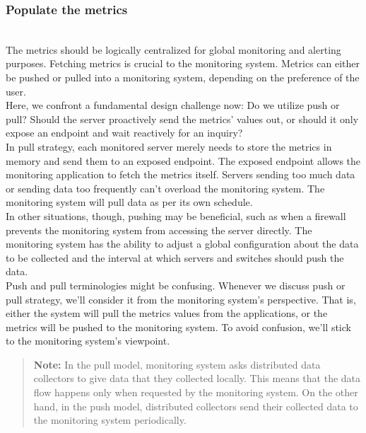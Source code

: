 \subsubsection{Populate the metrics}\label{ZAQM2n7isGBXjtOtaTkZj}
\\
The metrics should be logically centralized for global monitoring and alerting purposes. Fetching metrics is crucial to the monitoring system. Metrics can either be pushed or pulled into a monitoring system, depending on the preference of the user.
\\
Here, we confront a fundamental design challenge now: Do we utilize push or pull? Should the server proactively send the metrics' values out, or should it only expose an endpoint and wait reactively for an inquiry?
\\
In pull strategy, each monitored server merely needs to store the metrics in memory and send them to an exposed endpoint. The exposed endpoint allows the monitoring application to fetch the metrics itself. Servers sending too much data or sending data too frequently can't overload the monitoring system. The monitoring system will pull data as per its own schedule.
\\
In other situations, though, pushing may be beneficial, such as when a firewall prevents the monitoring system from accessing the server directly. The monitoring system has the ability to adjust a global configuration about the data to be collected and the interval at which servers and switches should push the data.
\\
Push and pull terminologies might be confusing. Whenever we discuss push or pull strategy, we'll consider it from the monitoring system's perspective. That is, either the system will pull the metrics values from the applications, or the metrics will be pushed to the monitoring system. To avoid confusion, we'll stick to the monitoring system's viewpoint.
\begin{quote}
\textbf{Note:} In the pull model, monitoring system asks distributed data collectors to give data that they collected locally. This means that the data flow happens only when requested by the monitoring system. On the other hand, in the push model, distributed collectors send their collected data to the monitoring system periodically.
\end{quote}

